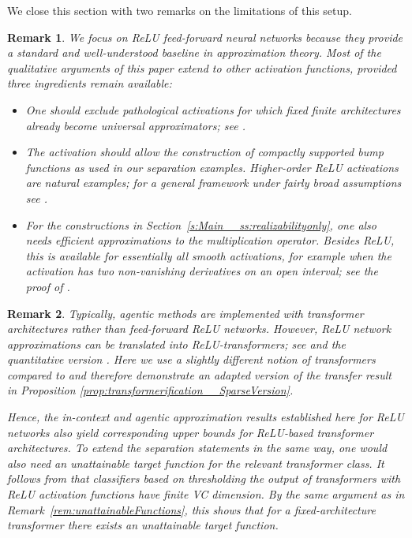 \documentclass{article}
\newtheorem{remark}{Remark}[section]
\begin{document}
We close this section with two remarks on the limitations of this setup.

\begin{remark}
We focus on ReLU feed-forward neural networks because they provide a standard and well-understood
baseline in approximation theory. Most of the qualitative arguments of this paper extend to other
activation functions, provided three ingredients remain available:
\begin{itemize}
    \item One should exclude pathological activations for which fixed finite architectures already
    become universal approximators; see \cite{maiorov1999lower}.
    \item The activation should allow the construction of compactly supported bump functions as used in our separation examples. Higher-order ReLU
    activations are natural examples; for a general framework under fairly broad assumptions %
    see \cite{guhring2021encodable}.
    \item For the constructions in Section~\ref{s:Main__ss:realizabilityonly}, one also needs efficient
    approximations to the multiplication operator. 
    Besides ReLU, this is available for essentially all smooth activations, for
    example when the activation has two non-vanishing derivatives on an open interval; see the proof of \cite[Proposition 3.4]{pinkus1999mlp}.
\end{itemize}
\end{remark}


\begin{remark}\label{rem:transformers}
Typically, agentic methods are implemented with transformer architectures rather than feed-forward
ReLU networks. However, ReLU network approximations can be translated into ReLU-transformers;
see \cite{furuya2025transformers} and the quantitative version \cite[Proposition~11]{kratsios2025context}. 
Here we use a slightly different notion of transformers compared to \cite[Proposition~11]{kratsios2025context} and therefore demonstrate an adapted version of the transfer result in Proposition  \ref{prop:transformerification__SparseVersion}.

Hence, the in-context and agentic approximation results established here for ReLU networks also yield corresponding upper bounds for ReLU-based transformer architectures. To extend the separation statements in the same way, one would also need an unattainable target function for the relevant transformer class. 
It follows from \cite[Theorem 8.14]{AnthonyBartlett2009NeuralNetworkLearning} that classifiers based on thresholding the output of transformers with ReLU activation functions have finite VC dimension. By the same argument as in Remark~\ref{rem:unattainableFunctions}, this shows that for a fixed-architecture transformer there exists an unattainable target function.
\end{remark}
\end{document}
